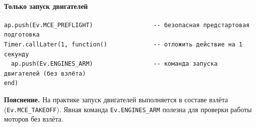 \paragraph{Только запуск двигателей}
\begin{verbatim}
ap.push(Ev.MCE_PREFLIGHT)                 -- безопасная предстартовая подготовка
Timer.callLater(1, function()             -- отложить действие на 1 секунду
  ap.push(Ev.ENGINES_ARM)                 -- команда запуска двигателей (без взлёта)
end)
\end{verbatim}
\textbf{Пояснение.} На практике запуск двигателей выполняется в составе взлёта (\texttt{Ev.MCE\_TAKEOFF}). Явная команда \texttt{Ev.ENGINES\_ARM} полезна для проверки работы моторов без взлёта.
